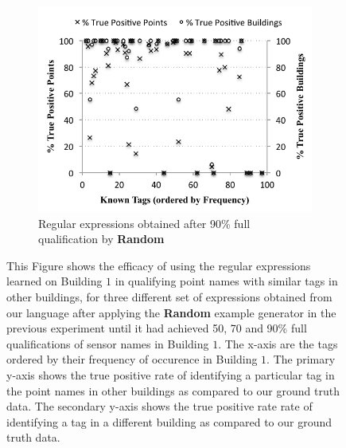 \begin{figure}[ht!]
	\begin{subfigure}{0.4\textwidth}
                \centering
		\includegraphics[width=\textwidth]{./figs/recallCampusWide-90.pdf}
                \caption{Regular expressions obtained after 90\% full qualification by {\bf Random}}
		\label{fig:full90}
	\end{subfigure}
\caption{This Figure shows the efficacy of using the regular expressions learned on Building $1$ in qualifying point names with similar tags in other buildings, for three different set of expressions obtained from our language after applying the {\bf Random} example generator in the previous experiment until it had achieved 50, 70 and 90\% full qualifications of sensor names in Building $1$. The x-axis are the tags ordered by their frequency of occurence in Building $1$. The primary y-axis shows the true positive rate of identifying a particular tag in the point names in other buildings as compared to our ground truth data. The secondary y-axis shows the true positive rate rate of identifying a tag in a different building as compared to our ground truth data.}
\label{fig:recallCampuswide}
\end{figure}

%









